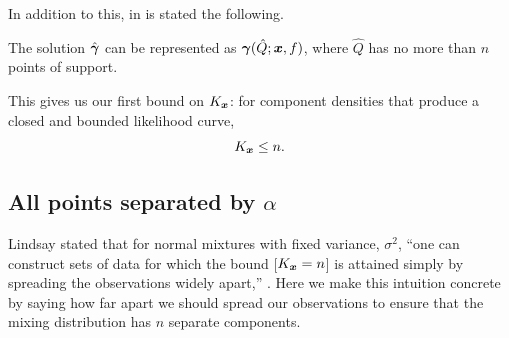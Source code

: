 	In addition to this, in \cite[Theorem 21]{Lindsay1995-sq} is stated the following.
	\begin{theorem}
		The solution $\hat{{\bm{{\gamma}}}}$ can be represented as ${\bm{{\gamma}}}(\hat{Q};{\bm{{x}}}, f)$, where $\hat{Q}$ has no more than $n$ points of support.
		\label{thm: lindsay no more than n points}
	\end{theorem}
	This gives us our first bound on $K_{\bm{{x}}}$: for component densities that produce a closed and bounded likelihood curve,
	\begin{equation}
		K_{\bm{{x}}} \leq n.
	\end{equation}

	\subsection{All points separated by \texorpdfstring{$\alpha$}{a}}
		Lindsay stated that for normal mixtures with fixed variance, $\sigma^2$, ``one can construct sets of data for which the bound [$K_{\bm{{x}}} = n$] is attained simply by spreading the observations widely apart,'' \cite[Section 5.2]{Lindsay1995-sq}. Here we make this intuition concrete by saying how far apart we should spread our observations to ensure that the mixing distribution has $n$ separate components.

		
